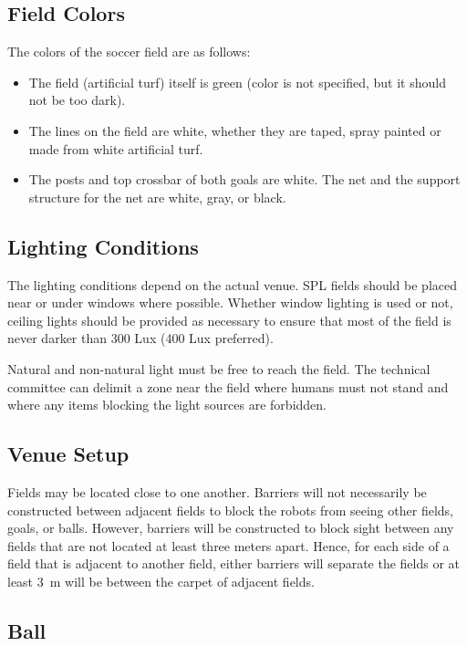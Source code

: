 \subsection{Field Colors}
\label{sec:field_colors}

The colors of the soccer field are as follows:
\begin{itemize}
  \item The field (artificial turf) itself is green (color is not specified, but it should not be too dark).
  \item The lines on the field are white, whether they are taped, spray painted or made from white artificial turf.
  \item The posts and top crossbar of both goals are white.
    The net and the support structure for the net are white, gray, or black.
\end{itemize}

\subsection{Lighting Conditions}
\label{sec:lightConditions}

The lighting conditions depend on the actual venue.
SPL fields should be placed near or under windows where possible.
Whether window lighting is used or not, ceiling lights should be provided as necessary to ensure that most of the field is never darker than 300 Lux (400 Lux preferred).

Natural and non-natural light must be free to reach the field. The technical committee can delimit a zone near the field where humans must not stand and where any items blocking the light sources are forbidden. 

\subsection{Venue Setup}
\label{sec:boundaries}

Fields may be located close to one another.
Barriers will not necessarily be constructed between adjacent fields to block the robots from seeing other fields, goals, or balls.
However, barriers will be constructed to block sight between any fields that are not located at least three meters apart.
Hence, for each side of a field that is adjacent to another field, either barriers will separate the fields or at least \qty{3}{\metre} will be between the carpet of adjacent fields.

\subsection{Ball}
\label{sec:ball}

